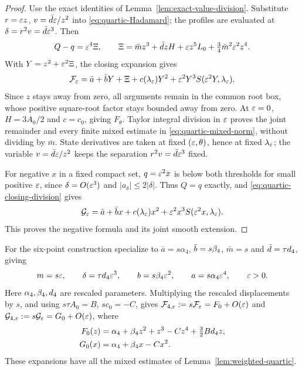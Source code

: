\begin{proof}
Use the exact identities of Lemma~\ref{lem:exact-value-division}.
Substitute \(r=\varepsilon z\), \(v=\bar d\varepsilon/z^2\) into
\eqref{eq:quartic-Hadamard}; the profiles are evaluated at
\(\delta=r^2v=\bar d\varepsilon^3\). Then
\[
 Q-q=\varepsilon^4\Xi,\qquad
 \Xi=\bar mz^3+\bar dzH+\varepsilon z^5L_0+\tfrac34\bar m^2\varepsilon^2z^4.
\]
With \(Y=z^2+\varepsilon^2\Xi\), the closing expansion gives
\begin{equation}\label{eq:quartic-exact-residual}
 \mathcal F_\varepsilon=
 \bar a+\bar bY+\Xi+c(\lambda_\varepsilon)Y^2
                   +\varepsilon^2Y^3S(\varepsilon^2Y,\lambda_\varepsilon).
\end{equation}
Since \(z\) stays away from zero, all arguments remain in the common
root box, whose positive square-root factor stays bounded away from zero.
At \(\varepsilon=0\), \(H=3A_0/2\) and \(c=c_0\), giving \(F_\theta\).
Taylor integral division in \(\varepsilon\) proves the joint remainder and
every finite mixed estimate in \eqref{eq:quartic-mixed-norm}, without
dividing by \(\bar m\). State derivatives are taken at fixed
\((\varepsilon,\theta)\), hence at fixed \(\lambda_\varepsilon\); the variable
\(v=\bar d\varepsilon/z^2\) keeps the separation \(r^2v=\bar d\varepsilon^3\) fixed.

For negative \(x\) in a fixed compact set, \(q=\varepsilon^2x\) is below
both thresholds for small positive \(\varepsilon\), since \(\delta=O(\varepsilon^3)\) and
\(|a_\delta|\le2|\delta|\). Thus \(Q=q\) exactly, and
\eqref{eq:quartic-closing-division} gives
\[
 \mathcal G_\varepsilon=\bar a+\bar b x+c(\lambda_\varepsilon)x^2
                   +\varepsilon^2x^3S(\varepsilon^2x,\lambda_\varepsilon).
\]
This proves the negative formula and its joint smooth extension.
\end{proof}

For the six-point construction specialize to
\(\bar a=s\alpha_4\), \(\bar b=s\beta_4\), \(\bar m=s\) and
\(\bar d=\tau d_4\), giving
\begin{equation}\label{eq:quartic-weights}
 m=s\varepsilon,\qquad \delta=\tau d_4\varepsilon^3,\qquad
 b=s\beta_4\varepsilon^2,\qquad a=s\alpha_4\varepsilon^4,\qquad \varepsilon>0.
\end{equation}
Here \(\alpha_4,\beta_4,d_4\) are rescaled parameters.
Multiplying the rescaled displacements by \(s\), and using
\(s\tau A_0=B\), \(sc_0=-C\), gives
\(\mathcal F_{4,\varepsilon}:=s\mathcal F_\varepsilon=F_0+O(\varepsilon)\) and
\(\mathcal G_{4,\varepsilon}:=s\mathcal G_\varepsilon=G_0+O(\varepsilon)\), where
\[
 \begin{aligned}
 F_0(z)&=\alpha_4+\beta_4 z^2+z^3-Cz^4+\tfrac32Bd_4 z,\\
 G_0(x)&=\alpha_4+\beta_4 x-Cx^2.
 \end{aligned}
\]
These expansions have all the mixed estimates of
Lemma~\ref{lem:weighted-quartic}.

